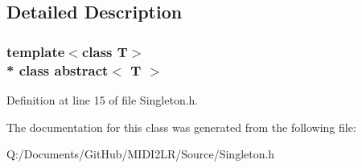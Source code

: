 \subsection{Detailed Description}
\subsubsection*{template$<$class T$>$\\*
class abstract$<$ T $>$}



Definition at line 15 of file Singleton.\+h.



The documentation for this class was generated from the following file\+:\begin{DoxyCompactItemize}
\item 
Q\+:/\+Documents/\+Git\+Hub/\+M\+I\+D\+I2\+L\+R/\+Source/Singleton.\+h\end{DoxyCompactItemize}
